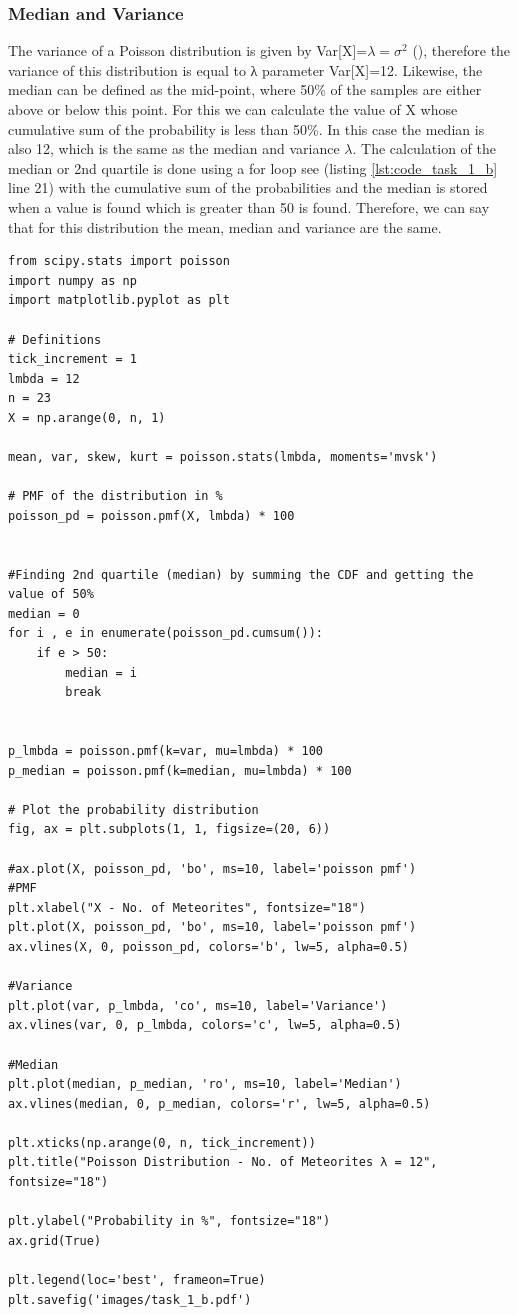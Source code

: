 \subsubsection{Median and Variance}
The variance of a Poisson distribution is given by Var[X]=$\lambda=\sigma^2$ (\cite{hogg:2005}), therefore the variance of this distribution is equal to λ parameter Var[X]=12.
Likewise, the median can be defined as the mid-point, where 50\% of the samples are either above or below this point. For this we can calculate the value of X whose cumulative sum of the probability is less than 50\%. In this case the median is also 12, which is the same as the median and variance $\lambda$. The calculation of the median or 2nd quartile is done using a for loop see (listing \ref{lst:code_task_1_b} line 21)  with the cumulative sum of the probabilities and the median is stored when a value is found which is greater than 50 is found. Therefore, we can say that for this distribution the mean, median and variance are the same.

\begin{lstlisting}[caption={Plotting the PMF for Poisson Distribution)},label={lst:code_task_1_b}]
from scipy.stats import poisson
import numpy as np
import matplotlib.pyplot as plt

# Definitions
tick_increment = 1
lmbda = 12
n = 23
X = np.arange(0, n, 1)

mean, var, skew, kurt = poisson.stats(lmbda, moments='mvsk')

# PMF of the distribution in %
poisson_pd = poisson.pmf(X, lmbda) * 100


#Finding 2nd quartile (median) by summing the CDF and getting the value of 50%
median = 0
for i , e in enumerate(poisson_pd.cumsum()):
    if e > 50:
        median = i
        break


p_lmbda = poisson.pmf(k=var, mu=lmbda) * 100
p_median = poisson.pmf(k=median, mu=lmbda) * 100

# Plot the probability distribution
fig, ax = plt.subplots(1, 1, figsize=(20, 6))

#ax.plot(X, poisson_pd, 'bo', ms=10, label='poisson pmf')
#PMF
plt.xlabel("X - No. of Meteorites", fontsize="18")
plt.plot(X, poisson_pd, 'bo', ms=10, label='poisson pmf')
ax.vlines(X, 0, poisson_pd, colors='b', lw=5, alpha=0.5)

#Variance
plt.plot(var, p_lmbda, 'co', ms=10, label='Variance')
ax.vlines(var, 0, p_lmbda, colors='c', lw=5, alpha=0.5)

#Median
plt.plot(median, p_median, 'ro', ms=10, label='Median')
ax.vlines(median, 0, p_median, colors='r', lw=5, alpha=0.5)

plt.xticks(np.arange(0, n, tick_increment))
plt.title("Poisson Distribution - No. of Meteorites λ = 12", fontsize="18")

plt.ylabel("Probability in %", fontsize="18")
ax.grid(True)

plt.legend(loc='best', frameon=True)
plt.savefig('images/task_1_b.pdf')

\end{lstlisting}

